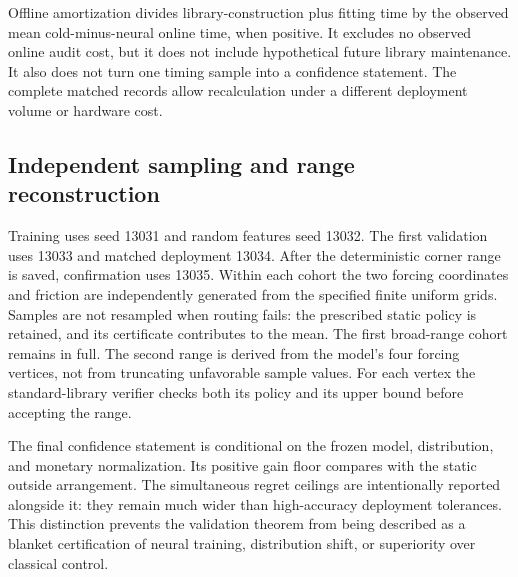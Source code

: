 Offline amortization divides library-construction plus fitting time by the observed mean cold-minus-neural online time, when positive. It excludes no observed online audit cost, but it does not include hypothetical future library maintenance. It also does not turn one timing sample into a confidence statement. The complete matched records allow recalculation under a different deployment volume or hardware cost.

\subsection{Independent sampling and range reconstruction}
Training uses seed 13031 and random features seed 13032. The first validation uses 13033 and matched deployment 13034. After the deterministic corner range is saved, confirmation uses 13035. Within each cohort the two forcing coordinates and friction are independently generated from the specified finite uniform grids. Samples are not resampled when routing fails: the prescribed static policy is retained, and its certificate contributes to the mean. The first broad-range cohort remains in full. The second range is derived from the model's four forcing vertices, not from truncating unfavorable sample values. For each vertex the standard-library verifier checks both its policy and its upper bound before accepting the range.

The final confidence statement is conditional on the frozen model, distribution, and monetary normalization. Its positive gain floor compares with the static outside arrangement. The simultaneous regret ceilings are intentionally reported alongside it: they remain much wider than high-accuracy deployment tolerances. This distinction prevents the validation theorem from being described as a blanket certification of neural training, distribution shift, or superiority over classical control.
